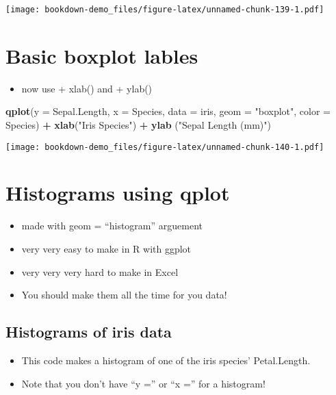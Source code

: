 \documentclass[]{book}
\newenvironment{Shaded}{\begin{snugshade}}{\end{snugshade}}
\newcommand{\KeywordTok}[1]{\textcolor[rgb]{0.13,0.29,0.53}{\textbf{#1}}}
\newcommand{\DataTypeTok}[1]{\textcolor[rgb]{0.13,0.29,0.53}{#1}}
\newcommand{\StringTok}[1]{\textcolor[rgb]{0.31,0.60,0.02}{#1}}
\newcommand{\OperatorTok}[1]{\textcolor[rgb]{0.81,0.36,0.00}{\textbf{#1}}}
\newcommand{\NormalTok}[1]{#1}
\providecommand{\tightlist}{%
  \setlength{\itemsep}{0pt}\setlength{\parskip}{0pt}}
\theoremstyle{definition}
\theoremstyle{definition}
\theoremstyle{definition}
\theoremstyle{remark}
\begin{document}
\texttt{[image: bookdown-demo\_files/figure-latex/unnamed-chunk-139-1.pdf]}

\section{Basic boxplot lables}\label{basic-boxplot-lables}

\begin{itemize}
\tightlist
\item
  now use + xlab() and + ylab()
\end{itemize}

\begin{Shaded}
\begin{Highlighting}[]
\KeywordTok{qplot}\NormalTok{(}\DataTypeTok{y =}\NormalTok{ Sepal.Length,}
      \DataTypeTok{x =}\NormalTok{ Species,    }
        \DataTypeTok{data =}\NormalTok{ iris,}
      \DataTypeTok{geom =} \StringTok{"boxplot"}\NormalTok{,}
      \DataTypeTok{color =}\NormalTok{ Species) }\OperatorTok{+}
\StringTok{  }\KeywordTok{xlab}\NormalTok{(}\StringTok{"Iris Species"}\NormalTok{) }\OperatorTok{+}\StringTok{  }
\StringTok{  }\KeywordTok{ylab}\NormalTok{ (}\StringTok{"Sepal Length (mm)"}\NormalTok{)}
\end{Highlighting}
\end{Shaded}

\texttt{[image: bookdown-demo\_files/figure-latex/unnamed-chunk-140-1.pdf]}

\section{Histograms using qplot}\label{histograms-using-qplot}

\begin{itemize}
\tightlist
\item
  made with geom = ``histogram'' arguement
\item
  very very easy to make in R with ggplot
\item
  very very very hard to make in Excel
\item
  You should make them all the time for you data!
\end{itemize}

\subsection{Histograms of iris data}\label{histograms-of-iris-data}

\begin{itemize}
\tightlist
\item
  This code makes a histogram of one of the iris species' Petal.Length.
\item
  Note that you don't have ``y ='' or ``x ='' for a histogram!
\end{itemize}
\end{document}
